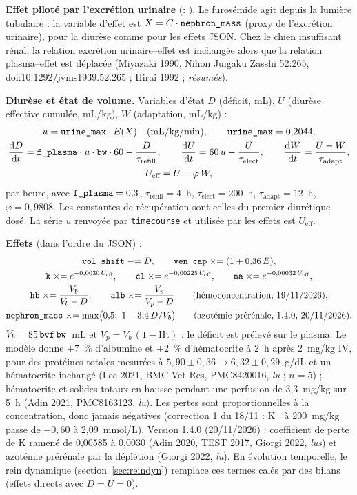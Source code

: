\documentclass[10pt,a4paper]{article}
\newcommand{\cmd}[1]{\texttt{#1}}
\newcommand{\vp}[1]{\text{\texttt{\detokenize{#1}}}}
\newcommand{\acc}[1]{\textsl{#1}}
\newcommand{\dd}{\mathrm{d}}
\begin{document}
\textbf{Effet piloté par l'excrétion urinaire} (\vp{drive}: \vp{urinary_excretion}). Le furosémide agit depuis la lumière tubulaire : la variable d'effet est $X = C\cdot\vp{nephron_mass}$ (proxy de l'excrétion urinaire), pour la diurèse comme pour les effets JSON. Chez le chien insuffisant rénal, la relation excrétion urinaire--effet est inchangée alors que la relation plasma--effet est déplacée (Miyazaki 1990, Nihon Juigaku Zasshi 52:265, doi:10.1292/jvms1939.52.265 ; Hirai 1992 ; \acc{résumés}).

\textbf{Diurèse et état de volume.} Variables d'état $D$ (déficit, mL), $U$ (diurèse effective cumulée, mL/kg), $W$ (adaptation, mL/kg) :
\begin{gather}
u = \vp{urine_max}\cdot E(X)\quad(\text{mL/kg/min}),\qquad \vp{urine_max} = 0{,}2044,\\
\frac{\dd D}{\dd t} = \vp{f_plasma}\cdot u\cdot\vp{bw}\cdot 60 - \frac{D}{\tau_\text{refill}},\qquad
\frac{\dd U}{\dd t} = 60\,u - \frac{U}{\tau_\text{elect}},\qquad
\frac{\dd W}{\dd t} = \frac{U - W}{\tau_\text{adapt}},\\
U_\text{eff} = U - \varphi\,W,
\end{gather}
par heure, avec $\vp{f_plasma} = 0{,}3$, $\tau_\text{refill} = 4$~h, $\tau_\text{elect} = 200$~h, $\tau_\text{adapt} = 12$~h, $\varphi = 0{,}9808$. Les constantes de récupération sont celles du premier diurétique dosé. La série $u$ renvoyée par \cmd{timecourse} et utilisée par les effets est $U_\text{eff}$.

\textbf{Effets} (dans l'ordre du JSON) :
\begin{gather}
\vp{vol_shift} \mathrel{-}= D,\qquad \vp{ven_cap} \mathrel{\times}= (1 + 0{,}36\,E),\\
\vp{k} \mathrel{\times}= e^{-0{,}0030\,U_\text{eff}},\qquad \vp{cl} \mathrel{\times}= e^{-0{,}00225\,U_\text{eff}},\qquad \vp{na} \mathrel{\times}= e^{-0{,}00032\,U_\text{eff}},\\
\vp{hb} \mathrel{\times}= \frac{V_b}{V_b - D},\qquad \vp{alb} \mathrel{\times}= \frac{V_p}{V_p - D}\qquad\text{(hémoconcentration, 19/11/2026)},\\
\vp{nephron_mass} \mathrel{\times}= \max\bigl(0{,}5;\ 1 - 3{,}4\,D/V_b\bigr)\qquad\text{(azotémie prérénale, 1.4.0, 20/11/2026)}.
\end{gather}
$V_b = 85\,\vp{bvf}\,\vp{bw}$~mL et $V_p = V_b\,(1 - \text{Ht})$ : le déficit est prélevé sur le
plasma. Le modèle donne $+7$~\% d'albumine et $+2$~\% d'hématocrite à 2~h après 2~mg/kg IV, pour
des protéines totales mesurées à $5{,}90 \pm 0{,}36 \to 6{,}32 \pm 0{,}29$~g/dL et un hématocrite
inchangé (Lee 2021, BMC Vet Res, PMC8420016, \acc{lu} ; $n = 5$) ; hématocrite et solides totaux
en hausse pendant une perfusion de 3,3~mg/kg sur 5~h (Adin 2021, PMC8163123, \acc{lu}).
Les pertes sont proportionnelles à la concentration, donc jamais négatives (correction 1 du 18/11 : K$^+$ à 200~mg/kg passe de $-0{,}60$ à 2,09~mmol/L). Version 1.4.0 (20/11/2026) : coefficient de perte de K ramené de 0,00585 à 0,0030 (Adin 2020, TEST 2017, Giorgi 2022, \acc{lus}) et azotémie prérénale par la déplétion (Giorgi 2022, \acc{lu}). En évolution temporelle, le rein dynamique (section~\ref{sec:reindyn}) remplace ces termes calés par des bilans (effets directs avec $D = U = 0$).
\end{document}
